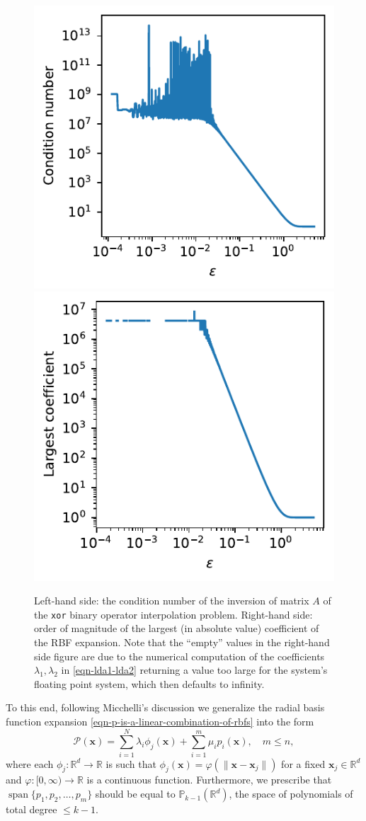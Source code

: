 \documentclass[12pt]{report} %
\newcommand{\tmmathbf}[1]{\ensuremath{\boldsymbol{#1}}}
\newcommand{\tmop}[1]{\ensuremath{\operatorname{#1}}}
\begin{document}
\begin{figure}[ht]
    \centering
    {\includegraphics[width=.45\textwidth]{imagenes/xor/xor_conditioning_graph.pdf}}
    {\includegraphics[width=.45\textwidth]{imagenes/xor/xor_largest_coef_graph.pdf}}
    \caption{Left-hand side: the condition number of the inversion of matrix $A$ of the \texttt{xor} binary operator interpolation problem. Right-hand side: order of magnitude of the largest (in absolute value) coefficient of the RBF expansion. Note that the ``empty'' values in the right-hand side figure are due to the numerical computation of the coefficients $\lambda_1, \lambda_2$ in \eqref{eqn-lda1-lda2} returning a value too large for the system's floating point system, which then defaults to infinity.}
    \label{fig:xor-coefficients-conditioning}
\end{figure}

To this end, following Micchelli's discussion \cite{micchelli1984interpolation} we generalize the radial basis function expansion \eqref{eqn-p-is-a-linear-combination-of-rbfs} into the form
\begin{equation}
  \mathcal{P} (\tmmathbf{x}) = \sum_{i = 1}^N \lambda_i \phi_j (\tmmathbf{x})
  + \sum_{i = 1}^m \mu_i p_i (\tmmathbf{x}), \quad m \leq n,
  \label{eqn-rbf-poly}
\end{equation}
where each $\phi_j : \mathbb{R}^d \rightarrow \mathbb{R}$ is such that
$\phi_j (\tmmathbf{x}) = \varphi (\| \tmmathbf{x}-\tmmathbf{x}_j \|)$ for a
fixed $\tmmathbf{x}_j \in \mathbb{R}^d$ and $\varphi : [0, \infty) \rightarrow
\mathbb{R}$ is a continuous function. Furthermore, we prescribe that
$\tmop{span} \{ p_1, p_2, \ldots, p_m \}$ should be equal to $\mathbb{P}_{k -
1} (\mathbb{R}^d)$, the space of polynomials of total degree $\leq k - 1$.
\end{document}
